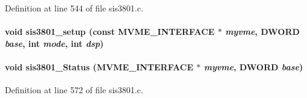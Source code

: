 Definition at line 544 of file sis3801.c.
\paragraph[{sis3801\_\-setup}]{\setlength{\rightskip}{0pt plus 5cm}void sis3801\_\-setup (const {\bf MVME\_\-INTERFACE} $\ast$ {\em myvme}, \/  {\bf DWORD} {\em base}, \/  int {\em mode}, \/  int {\em dsp})}\hfill\label{sis3801_8h_a64901090a0aad26d323e5dace109a458}
\paragraph[{sis3801\_\-Status}]{\setlength{\rightskip}{0pt plus 5cm}void sis3801\_\-Status ({\bf MVME\_\-INTERFACE} $\ast$ {\em myvme}, \/  {\bf DWORD} {\em base})}\hfill\label{sis3801_8h_ad33debd8d89a953de2ea9217b55db7ce}


Definition at line 572 of file sis3801.c.